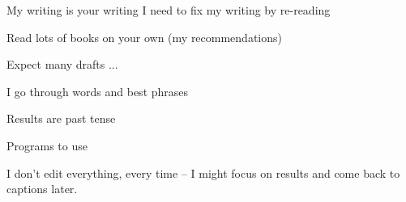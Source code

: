 
My writing is your writing
I need to fix my writing by re-reading

Read lots of books on your own (my recommendations)

Expect many drafts ... 

I go through words and best phrases

Results are past tense

Programs to use

I don't edit everything, every time -- I might focus on results and come back to captions later. 
